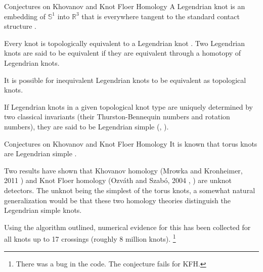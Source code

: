 \documentclass{beamer}
\begin{document}
    \begin{frame}{Conjectures on Khovanov and Knot Floer Homology}
        A Legendrian knot is an embedding of $\mathbb{S}^{1}$ into
        $\mathbb{R}^{3}$ that is everywhere tangent to the standard
        contact structure
        \cite[p.~1282-1283]{JoshuaMSabloffWhatIsLegendrianKnot}.
        \par\hfill\par
        Every knot is topologically equivalent to a Legendrian knot
        \cite[p.~1003]{VeraVertessiTransNonSimpleKnots}. Two
        Legendrian knots are said to be equivalent if they are equivalent
        through a homotopy of Legendrian knots.
        \par\hfill\par
        It is possible for inequivalent
        Legendrian knots to be equivalent as topological knots.
        \par\hfill\par
        If Legendrian knots in a given topological knot type are uniquely
        determined by two classical invariants (their Thurston-Bennequin
        numbers and rotation numbers), they are said to be Legendrian simple
        (\cite[p.~12]{Foldvari2019legnonsimple},
        \cite[p.~1004]{VeraVertessiTransNonSimpleKnots}).
    \end{frame}
    \begin{frame}{Conjectures on Khovanov and Knot Floer Homology}
        It is known that torus knots are Legendrian simple
        \cite[p.~64]{EtnyreHondaContactTopologyI}.
        \par\hfill\par
        Two results have shown that Khovanov homology (Mrowka and Kronheimer,
        2011 \cite{KronheimerMrowka2011KhovanovUnknot})
        and Knot Floer homology
        (Ozv\'{a}th and Szab\'{o}, 2004
        \cite[p.~633]{ManolescuOzsvathSarkarCombinatorialDescriptionOfKnotFloerHomology},
        \cite[p.~313]{OzsvathSzaboHolomorphicDisksGenusBounds})
        are unknot detectors.
        The unknot being the simplest of the torus knots, a somewhat natural
        generalization would be that these two homology theories
        distinguish the Legendrian simple knots.
        \par\hfill\par
        Using the algorithm outlined, numerical evidence for this has been
        collected for all knots up to 17 crossings (roughly 8 million knots).%
        \footnote{\textbf{\color{red}{Correction:}} There was a bug in the
                  code. The conjecture fails for KFH.}
    \end{frame}
\end{document}
